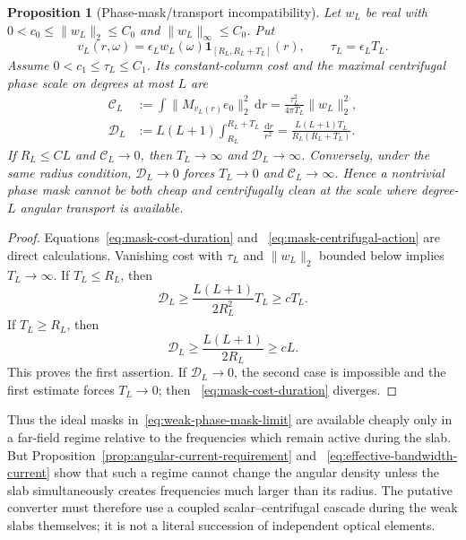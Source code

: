 \documentclass[11pt]{article}
\newcommand{\dd}{\,\mathrm d}
\newtheorem{proposition}[theorem]{Proposition}
\theoremstyle{definition}
\theoremstyle{remark}
\begin{document}
\begin{proposition}[Phase-mask/transport incompatibility]
\label{prop:phase-mask-transport-incompatibility}
Let $w_L$ be real with
$0<c_0\leq\|w_L\|_2\leq C_0$ and $\|w_L\|_\infty\leq C_0$.  Put
\begin{equation}
 v_L(r,\omega)=\epsilon_Lw_L(\omega)
 \mathbf1_{[R_L,R_L+T_L]}(r),
 \qquad \tau_L=\epsilon_LT_L.
\end{equation}
Assume $0<c_1\leq\tau_L\leq C_1$.  Its constant-column cost and the maximal
centrifugal phase scale on degrees at most $L$ are
\begin{align}
 \mathcal C_L
 &:=\int\|M_{v_L(r)}e_0\|_2^2\dd r
 =\frac{\tau_L^2}{4\pi T_L}\|w_L\|_2^2,
 \label{eq:mask-cost-duration}\\
 \mathcal D_L
 &:=L(L+1)\int_{R_L}^{R_L+T_L}\frac{\dd r}{r^2}
 =\frac{L(L+1)T_L}{R_L(R_L+T_L)}.
 \label{eq:mask-centrifugal-action}
\end{align}
If $R_L\leq C L$ and $\mathcal C_L\to0$, then
$T_L\to\infty$ and $\mathcal D_L\to\infty$.  Conversely, under the same
radius condition, $\mathcal D_L\to0$ forces $T_L\to0$ and
$\mathcal C_L\to\infty$.  Hence a nontrivial phase mask cannot be both cheap
and centrifugally clean at the scale where degree-$L$ angular transport is
available.
\end{proposition}

\begin{proof}
Equations~\eqref{eq:mask-cost-duration} and
~\eqref{eq:mask-centrifugal-action} are direct calculations.  Vanishing cost
with $\tau_L$ and $\|w_L\|_2$ bounded below implies $T_L\to\infty$.  If
$T_L\leq R_L$, then
\begin{equation}
 \mathcal D_L\geq
 \frac{L(L+1)}{2R_L^2}T_L\geq cT_L.
\end{equation}
If $T_L\geq R_L$, then
\begin{equation}
 \mathcal D_L\geq\frac{L(L+1)}{2R_L}\geq cL.
\end{equation}
This proves the first assertion.  If $\mathcal D_L\to0$, the second case is
impossible and the first estimate forces $T_L\to0$; then
~\eqref{eq:mask-cost-duration} diverges.
\end{proof}

Thus the ideal masks in~\eqref{eq:weak-phase-mask-limit} are available cheaply
only in a far-field regime relative to the frequencies which remain active
during the slab.  But Proposition~\ref{prop:angular-current-requirement} and
~\eqref{eq:effective-bandwidth-current} show that such a regime cannot change
the angular density unless the slab simultaneously creates frequencies much
larger than its radius.  The putative converter must therefore use a coupled
scalar--centrifugal cascade during the weak slabs themselves; it is not a
literal succession of independent optical elements.
\end{document}
